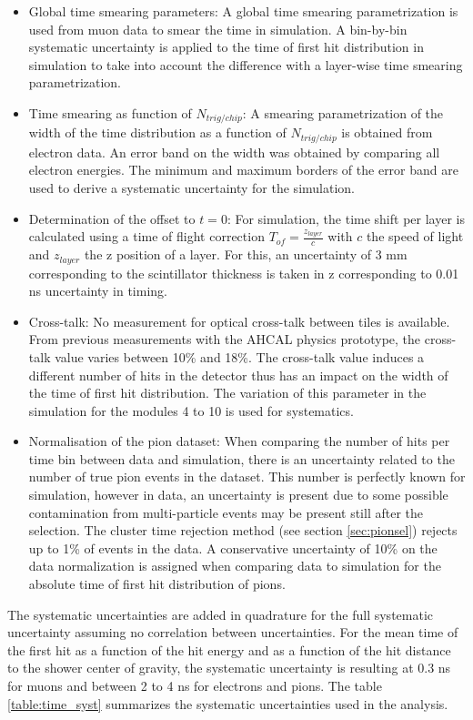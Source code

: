 \documentclass{JINST}
\begin{document}
\begin{itemize}
  \item Global time smearing parameters: A global time smearing parametrization is used from muon data to smear the time in simulation. A bin-by-bin systematic uncertainty is applied to the time of first hit distribution in simulation to take into account the difference with a layer-wise time smearing parametrization.
  \item Time smearing as function of $N_{trig/chip}$: A smearing parametrization of the width of the time distribution as a function of $N_{trig/chip}$ is obtained from electron data. An error band on the width was obtained by comparing all electron energies. The minimum and maximum borders of the error band are used to derive a systematic uncertainty for the simulation.
  \item Determination of the offset to $t=0$: For simulation, the time shift per layer is calculated using a time of flight correction $T_{of} = \frac{z_{layer}}{c}$ with $c$ the speed of light and $z_{layer}$ the z position of a layer. For this, an uncertainty of 3 mm corresponding to the scintillator thickness is taken in z corresponding to 0.01 ns uncertainty in timing.
  \item Cross-talk: No measurement for optical cross-talk between tiles is available. From previous measurements with the AHCAL physics prototype, the cross-talk value varies between 10\% and 18\%. The cross-talk value induces a different number of hits in the detector thus has an impact on the width of the time of first hit distribution. The variation of this parameter in the simulation for the modules 4 to 10 is used for systematics.
  \item Normalisation of the pion dataset: When comparing the number of hits per time bin between data and simulation, there is an uncertainty related to the number of true pion events in the dataset. This number is perfectly known for simulation, however in data, an uncertainty is present due to some possible contamination from multi-particle events may be present still after the selection. The cluster time rejection method (see section \ref{sec:pionsel}) rejects up to 1\% of events in the data. A conservative uncertainty of 10\% on the data normalization is assigned when comparing data to simulation for the absolute time of first hit distribution of pions.
\end{itemize}

The systematic uncertainties are added in quadrature for the full systematic uncertainty assuming no correlation between uncertainties. For the mean time of the first hit as a function of the hit energy and as a function of the hit distance to the shower center of gravity, the systematic uncertainty is resulting at 0.3 ns for muons and between 2 to 4 ns for electrons and pions. The table \ref{table:time_syst} summarizes the systematic uncertainties used in the analysis.
\end{document}
